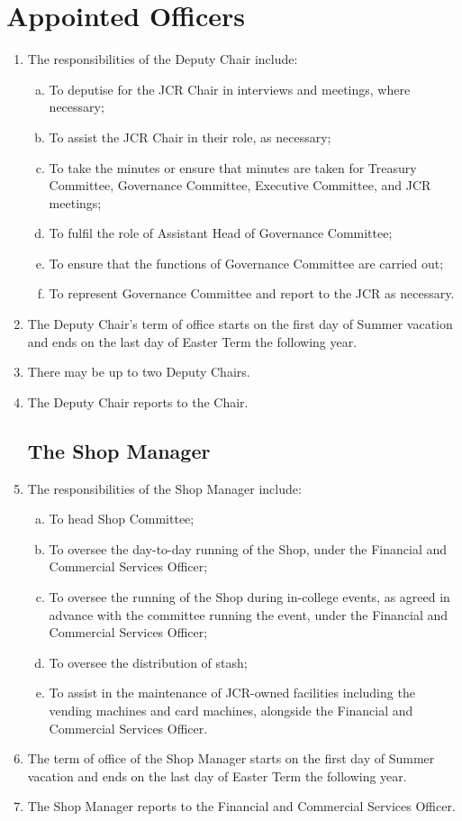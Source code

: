 \documentclass[12pt]{article}
\begin{document}
\section{Appointed Officers}
\begin{enumerate}
    \subsection{The Deputy Chair}
    \item The responsibilities of the Deputy Chair include:
    \begin{enumerate}[(a)]
        \item To deputise for the JCR Chair in interviews and meetings, where necessary;
        \item To assist the JCR Chair in their role, as necessary;
        \item To take the minutes or ensure that minutes are taken for Treasury Committee, Governance Committee, Executive Committee, and JCR meetings;
        \item To fulfil the role of Assistant Head of Governance Committee;
        \item To ensure that the functions of Governance Committee are carried out;
        \item To represent Governance Committee and report to the JCR as necessary.
    \end{enumerate}
    \item The Deputy Chair's term of office starts on the first day of Summer vacation and ends on the last day of Easter Term the following year.
    \item There may be up to two Deputy Chairs.
    \item The Deputy Chair reports to the Chair.
   
    \subsection{The Shop Manager}
    \item The responsibilities of the Shop Manager include:
    \begin{enumerate}[(a)]
        \item To head Shop Committee;
        \item To oversee the day-to-day running of the Shop, under the Financial and Commercial Services Officer;
        \item To oversee the running of the Shop during in-college events, as agreed in advance with the committee running the event, under the Financial and Commercial Services Officer;
        \item To oversee the distribution of stash;
        \item To assist in the maintenance of JCR-owned facilities including the vending machines and card machines, alongside the Financial and Commercial Services Officer.
    \end{enumerate}
    \item The term of office of the Shop Manager starts on the first day of Summer vacation and ends on the last day of Easter Term the following year.
    \item The Shop Manager reports to the Financial and Commercial Services Officer.

\end{enumerate}
\end{document}
